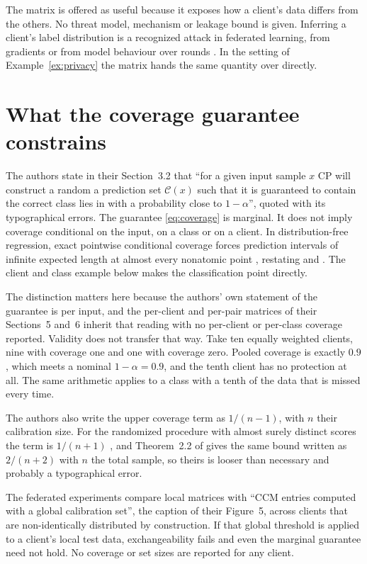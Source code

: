 \documentclass[11pt]{article}
\theoremstyle{definition}
\theoremstyle{definition}
\theoremstyle{remark}
\begin{document}
The matrix is offered as useful because it exposes how a client's data differs from the others. No
threat model, mechanism or leakage bound is given. Inferring a client's label distribution is a
recognized attack in federated learning, from gradients \citep{gu2023} or from model behaviour over
rounds \citep{ma2025}. In the setting of Example~\ref{ex:privacy} the matrix hands the same quantity
over directly.

\section{What the coverage guarantee constrains}\label{sec:coverage}

The authors state in their Section~3.2 that ``for a given input sample $x$ CP will construct a random
a prediction set $\mathcal{C}(x)$ such that it is guaranteed to contain the correct class lies in
with a probability close to $1-\alpha$'', quoted with its typographical errors. The guarantee \eqref{eq:coverage} is marginal. It does not imply coverage conditional on the input, on a class or on a client. In distribution-free regression, exact pointwise conditional coverage forces prediction intervals
of infinite expected length at almost every nonatomic point \citep[Proposition~1]{barber2021},
restating \citet{vovk2012} and \citet{leiwasserman2014}. The client and class
example below makes the classification point directly.

The distinction matters here because the authors' own statement of the guarantee is per input, and
the per-client and per-pair matrices of their Sections~5 and~6 inherit that reading with no
per-client or per-class coverage reported. Validity does not transfer that way. Take ten equally weighted
clients, nine with coverage one and one with coverage zero. Pooled coverage is exactly $0.9$, which
meets a nominal $1 - \alpha = 0.9$, and the tenth client has no protection at all. The same
arithmetic applies to a class with a tenth of the data that is missed every time.

The authors also write the upper coverage term as $1/(n-1)$, with $n$ their calibration size. For the randomized procedure with almost surely distinct scores the term is $1/(n+1)$
\citep[Theorem~1]{romano2020}, and Theorem~2.2 of \citet{lei2018} gives the same bound written as
$2/(n+2)$ with $n$ the total sample, so theirs is looser than necessary and probably a
typographical error.

The federated experiments compare local matrices with ``CCM entries computed with a global
calibration set'', the caption of their Figure~5, across clients that are non-identically
distributed by construction. If that global threshold is applied to a client's local test data, exchangeability fails and even
the marginal guarantee need not hold. No coverage or set sizes are reported for any client.
\end{document}
